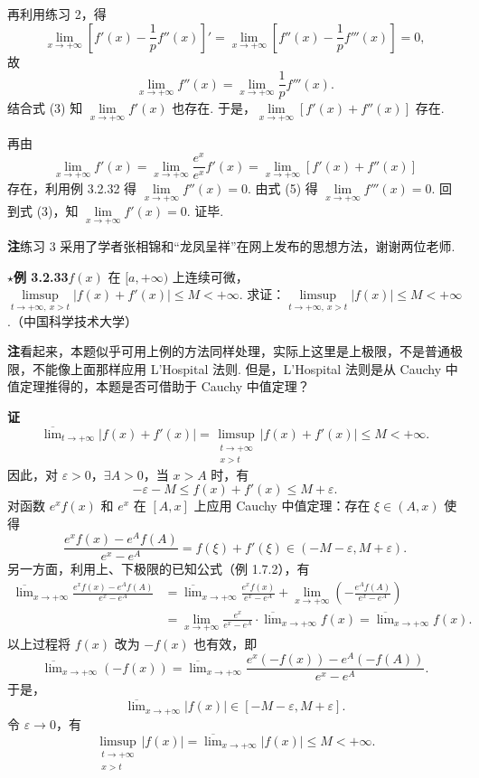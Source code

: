 \documentclass[UTF8, 12pt, fontset=fandol, oneside]{ctexart}
\begin{document}
再利用练习 2，得
\[
  \lim_{x\to+\infty}\left[f'(x)-\frac1p f''(x)\right]'
  =
  \lim_{x\to+\infty}\left[f''(x)-\frac1p f'''(x)\right]=0,
\]
故
\[
  \lim_{x\to+\infty}f''(x)=\lim_{x\to+\infty}\frac1p f'''(x).
\tag{5}
\]
结合式 (3) 知 $\lim\limits_{x\to+\infty}f'(x)$ 也存在. 于是，$\lim\limits_{x\to+\infty}[f'(x)+f''(x)]$ 存在.

再由
\[
  \lim_{x\to+\infty}f'(x)
  =
  \lim_{x\to+\infty}\frac{e^x}{e^x}f'(x)
  =
  \lim_{x\to+\infty}[f'(x)+f''(x)]
\]
存在，利用例 3.2.32 得 $\lim\limits_{x\to+\infty}f''(x)=0$. 由式 (5) 得 $\lim\limits_{x\to+\infty}f'''(x)=0$. 回到式 (3)，知 $\lim\limits_{x\to+\infty}f'(x)=0$. 证毕.

\noindent\textbf{注}\quad 练习 3 采用了学者张相锦和“龙凤呈祥”在网上发布的思想方法，谢谢两位老师.

\noindent\textbf{$\star$例 3.2.33}\quad $f(x)$ 在 $[a,+\infty)$ 上连续可微，$\limsup\limits_{t\to+\infty,\ x>t}|f(x)+f'(x)|\le M<+\infty$. 求证：$\limsup\limits_{t\to+\infty,\ x>t}|f(x)|\le M<+\infty$.（中国科学技术大学）

\noindent\textbf{注}\quad 看起来，本题似乎可用上例的方法同样处理，实际上这里是上极限，不是普通极限，不能像上面那样应用 L'Hospital 法则. 但是，L'Hospital 法则是从 Cauchy 中值定理推得的，本题是否可借助于 Cauchy 中值定理？

\noindent\textbf{证}\quad
\[
  \overline{\lim}_{t\to+\infty}|f(x)+f'(x)|
  =
  \limsup_{\substack{t\to+\infty\\ x>t}}|f(x)+f'(x)|\le M<+\infty.
\]
因此，对 $\varepsilon>0$，$\exists A>0$，当 $x>A$ 时，有
\[
  -\varepsilon-M\le f(x)+f'(x)\le M+\varepsilon.
\]
对函数 $e^xf(x)$ 和 $e^x$ 在 $[A,x]$ 上应用 Cauchy 中值定理：存在 $\xi\in(A,x)$ 使得
\[
  \frac{e^xf(x)-e^Af(A)}{e^x-e^A}
  =
  f(\xi)+f'(\xi)\in(-M-\varepsilon,M+\varepsilon).
\tag{1}
\]
另一方面，利用上、下极限的已知公式（例 1.7.2），有
\[
\begin{aligned}
  \overline{\lim}_{x\to+\infty}\frac{e^xf(x)-e^Af(A)}{e^x-e^A}
  &=
  \overline{\lim}_{x\to+\infty}\frac{e^xf(x)}{e^x-e^A}
  +\lim_{x\to+\infty}\left(-\frac{e^Af(A)}{e^x-e^A}\right) \\
  &=
  \lim_{x\to+\infty}\frac{e^x}{e^x-e^A}\cdot
  \overline{\lim}_{x\to+\infty}f(x)
  =
  \overline{\lim}_{x\to+\infty}f(x).
\end{aligned}
\tag{2}
\]
以上过程将 $f(x)$ 改为 $-f(x)$ 也有效，即
\[
  \overline{\lim}_{x\to+\infty}(-f(x))
  =
  \overline{\lim}_{x\to+\infty}
  \frac{e^x(-f(x))-e^A(-f(A))}{e^x-e^A}.
\]
于是，
\[
  \overline{\lim}_{x\to+\infty}|f(x)|\in[-M-\varepsilon,M+\varepsilon].
\]
令 $\varepsilon\to0$，有
\[
  \limsup_{\substack{t\to+\infty\\ x>t}}|f(x)|
  =
  \overline{\lim}_{x\to+\infty}|f(x)|\le M<+\infty.
\]
\end{document}
